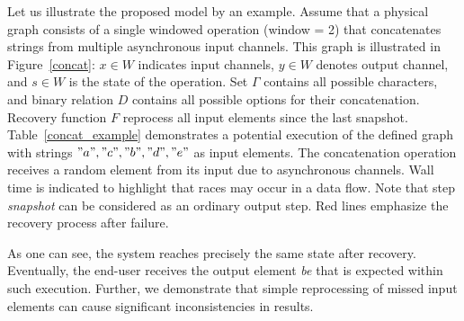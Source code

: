 Let us illustrate the proposed model by an example. Assume that a physical graph consists of a single windowed operation (window = 2) that concatenates strings from multiple asynchronous input channels. This graph is illustrated in Figure~\ref{concat}: $x \in W$ indicates input channels, $y\in W$ denotes output channel, and $ s \in W$ is the state of the operation. Set $\Gamma$ contains all possible characters, and binary relation $D$ contains all possible options for their concatenation. Recovery function $F$ reprocess all input elements since the last snapshot. Table~\ref{concat_example} demonstrates a potential execution of the defined graph with strings $"a","c","b","d","e"$ as input elements. The concatenation operation receives a random element from its input due to asynchronous channels. Wall time is indicated to highlight that races may occur in a data flow. Note that step {\em snapshot} can be considered as an ordinary output step. Red lines emphasize the recovery process after failure. 

As one can see, the system reaches precisely the same state after recovery. Eventually, the end-user receives the output element {\em be} that is expected within such execution. Further, we demonstrate that simple reprocessing of missed input elements can cause significant inconsistencies in results.

